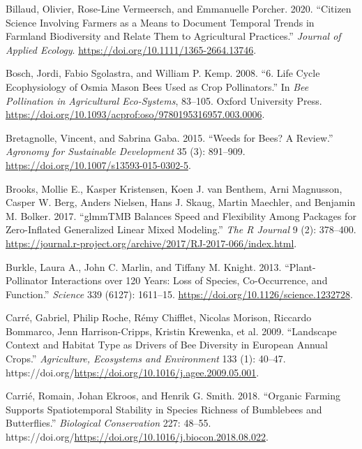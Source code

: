 \documentclass[smallextended]{svjour3}       %
\newlength{\cslhangindent}
\newenvironment{CSLReferences}[2] %
 {%
  \setlength{\parindent}{0pt}
  \ifodd #1 \everypar{\setlength{\hangindent}{\cslhangindent}}\ignorespaces\fi
  \ifnum #2 > 0
  \setlength{\parskip}{#2\baselineskip}
  \fi
 }%
 {}
\begin{document}
\begin{CSLReferences}{1}{0}
\leavevmode{}%
Billaud, Olivier, Rose-Line Vermeersch, and Emmanuelle Porcher. 2020.
{``Citizen Science Involving Farmers as a Means to Document Temporal
Trends in Farmland Biodiversity and Relate Them to Agricultural
Practices.''} \emph{Journal of Applied Ecology}.
\url{https://doi.org/10.1111/1365-2664.13746}.

\leavevmode{}%
Bosch, Jordi, Fabio Sgolastra, and William P. Kemp. 2008. {``6. Life
Cycle Ecophysiology of Osmia Mason Bees Used as Crop Pollinators.''} In
\emph{Bee Pollination in Agricultural Eco-Systems}, 83--105. Oxford
University Press.
\url{https://doi.org/10.1093/acprof:oso/9780195316957.003.0006}.

\leavevmode{}%
Bretagnolle, Vincent, and Sabrina Gaba. 2015. {``Weeds for Bees? A
Review.''} \emph{Agronomy for Sustainable Development} 35 (3): 891--909.
\url{https://doi.org/10.1007/s13593-015-0302-5}.

\leavevmode{}%
Brooks, Mollie E., Kasper Kristensen, Koen J. van Benthem, Arni
Magnusson, Casper W. Berg, Anders Nielsen, Hans J. Skaug, Martin
Maechler, and Benjamin M. Bolker. 2017. {``{glmmTMB} Balances Speed and
Flexibility Among Packages for Zero-Inflated Generalized Linear Mixed
Modeling.''} \emph{The R Journal} 9 (2): 378--400.
\url{https://journal.r-project.org/archive/2017/RJ-2017-066/index.html}.

\leavevmode{}%
Burkle, Laura A., John C. Marlin, and Tiffany M. Knight. 2013.
{``Plant-Pollinator Interactions over 120 Years: Loss of Species,
Co-Occurrence, and Function.''} \emph{Science} 339 (6127): 1611--15.
\url{https://doi.org/10.1126/science.1232728}.

\leavevmode{}%
Carré, Gabriel, Philip Roche, Rémy Chifflet, Nicolas Morison, Riccardo
Bommarco, Jenn Harrison-Cripps, Kristin Krewenka, et al. 2009.
{``Landscape Context and Habitat Type as Drivers of Bee Diversity in
European Annual Crops.''} \emph{Agriculture, Ecosystems and Environment}
133 (1): 40--47.
https://doi.org/\url{https://doi.org/10.1016/j.agee.2009.05.001}.

\leavevmode{}%
Carrié, Romain, Johan Ekroos, and Henrik G. Smith. 2018. {``Organic
Farming Supports Spatiotemporal Stability in Species Richness of
Bumblebees and Butterflies.''} \emph{Biological Conservation} 227:
48--55.
https://doi.org/\url{https://doi.org/10.1016/j.biocon.2018.08.022}.


\end{CSLReferences}
\end{document}
